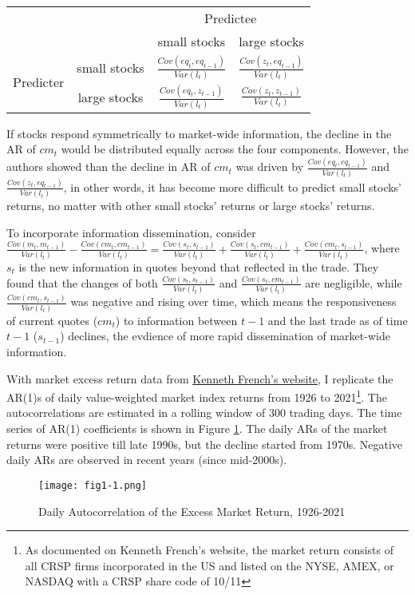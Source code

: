 \begin{enumerate}
    \begin{center}
        \begin{tabular}{cccc} 
        \hline
        & & \multicolumn{2}{c}{Predictee} \\
        & &small stocks & large stocks\\
        \hline
        \multirow{2}{4em}{Predicter} & small stocks & $\frac{Cov(eq_t,eq_{t-1})}{Var(l_t)}$ & $\frac{Cov(z_t,eq_{t-1})}{Var(l_t)}$ \\ 
        & large stocks & $\frac{Cov(eq_t,z_{t-1})}{Var(l_t)}$ & $\frac{Cov(z_t,z_{t-1})}{Var(l_t)}$ \\ 
        \hline
        \end{tabular}
    \end{center}

    If stocks respond symmetrically to market-wide information, the decline in the AR of $cm_t$ would be distributed equally across the four components. However, the authors showed than the decline in AR of $cm_t$ was driven by $\frac{Cov(eq_t,eq_{t-1})}{Var(l_t)}$ and $\frac{Cov(z_t,eq_{t-1})}{Var(l_t)}$,
    in other words, it has become more difficult to predict small stocks' returns, no matter with other small stocks' returns or large stocks' returns. 
    
    To incorporate information dissemination, consider $\frac{Cov(m_t,m_{t-1})}{Var(l_t)}-\frac{Cov(cm_t,cm_{t-1})}{Var(l_t)} = \frac{Cov(s_t,s_{t-1})}{Var(l_t)}+\frac{Cov(s_t,cm_{t-1})}{Var(l_t)}+\frac{Cov(cm_t,s_{t-1})}{Var(l_t)}$, where $s_t$ is the new information in quotes beyond that reflected in the trade. They found that
    the changes of both $\frac{Cov(s_t,s_{t-1})}{Var(l_t)}$ and $\frac{Cov(s_t,cm_{t-1})}{Var(l_t)}$ are negligible, while $\frac{Cov(cm_t,s_{t-1})}{Var(l_t)}$ was negative and rising over time, which means the responsiveness of current quotes ($cm_t$) to information between $t-1$ and the last trade as of time $t-1$ ($s_{t-1}$) declines,
    the evdience of more rapid dissemination of market-wide information.
\end{enumerate}

With market excess return data from \href{https://mba.tuck.dartmouth.edu/pages/faculty/ken.french/data_library.html}{Kenneth French's website}, I replicate the AR(1)s of daily value-weighted market index returns from 1926 to 2021\footnote{As documented on Kenneth French's website, the market return consists of all CRSP firms incorporated in the US and listed on the NYSE, AMEX, or NASDAQ with a CRSP share code of 10/11}.
The autocorrelations are estimated in a rolling window of 300 trading days. The time series of AR(1) coefficients is shown in Figure \ref{fig1-1}. The daily ARs of the market returns were positive till late 1990s, but the decline started from 1970s. Negative daily ARs are observed in recent years (since mid-2000s). 

\begin{figure}[ht]
    \texttt{[image: fig1-1.png]}
    \centering
    \caption{Daily Autocorrelation of the Excess Market Return, 1926-2021}\label{fig1-1}
\end{figure}